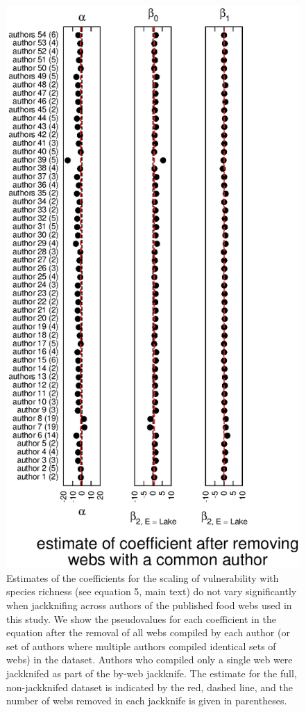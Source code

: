 \documentclass[12pt]{article}
\begin{document}
    \begin{figure}[!h]
    \centerline{\includegraphics*[height=.75\textheight]{Figures/Jackknife/Vul_author.eps}}
    \caption{Estimates of the coefficients for the scaling of vulnerability with species richness
    (see equation 5, main text) do not vary significantly
    when jackknifing across authors of the published food webs used in this study. 
    We show the pseudovalues for each coefficient
    in the equation after the removal of all webs compiled by each author (or set of authors where
    multiple authors compiled identical sets of webs) in the dataset. Authors
    who compiled only a single web were jackknifed as part of the by-web jackknife.
    The estimate for the full, non-jackknifed dataset is indicated by the red, dashed line, and
    the number of webs removed in each jackknife is given in parentheses.}
    \label{Vul_auth}
    \end{figure}
\end{document}
